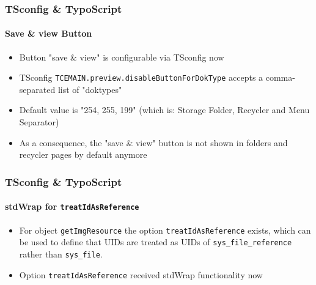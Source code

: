 \begin{frame}[fragile]
	\frametitle{TSconfig \& TypoScript}
	\framesubtitle{Save \& view Button}

	\begin{itemize}

		\item Button "save \& view" is configurable via TSconfig now

		\item TSconfig \texttt{TCEMAIN.preview.disableButtonForDokType} accepts a comma-separated list of "doktypes"

		\item Default value is "254, 255, 199" (which is: Storage Folder, Recycler and Menu Separator)

		\item As a consequence, the "save \& view" button is not shown in folders and recycler pages by default anymore

	\end{itemize}

\end{frame}

\begin{frame}[fragile]
	\frametitle{TSconfig \& TypoScript}
	\framesubtitle{stdWrap for \texttt{treatIdAsReference}}

	\begin{itemize}

		\item For object \texttt{getImgResource} the option \texttt{treatIdAsReference} exists,
			which can be used to define that UIDs are treated as UIDs of \texttt{sys\_file\_reference}
			rather than \texttt{sys\_file}.

		\item Option \texttt{treatIdAsReference} received stdWrap functionality now

	\end{itemize}

\end{frame}

